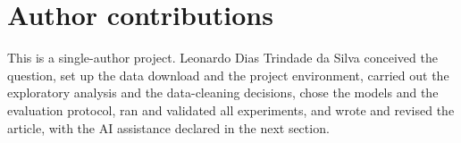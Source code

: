 \section*{Author contributions}
This is a single-author project. Leonardo Dias Trindade da Silva conceived the
question, set up the data download and the project environment, carried out
the exploratory analysis and the data-cleaning decisions, chose the models and
the evaluation protocol, ran and validated all experiments, and wrote and
revised the article, with the AI assistance declared in the next section.

